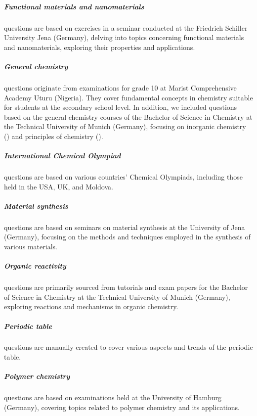 \documentclass[11pt, oneside]{article}
\begin{document}
\begin{refsection}
\subparagraph{Functional materials and nanomaterials}
  questions are based on exercises in a seminar conducted at the Friedrich Schiller University Jena (Germany), delving into topics concerning functional materials and nanomaterials, exploring their properties and applications.

\subparagraph{General chemistry}
 questions originate from examinations for grade 10 at Marist Comprehensive Academy Uturu (Nigeria). 
They cover fundamental concepts in chemistry suitable for students at the secondary school level.
In addition, we included questions based on the general chemistry courses of the Bachelor of Science in Chemistry at the Technical University of Munich (Germany), focusing on inorganic chemistry () and principles of chemistry ().

\subparagraph{International Chemical Olympiad}
 questions are based on various countries' Chemical Olympiads, including those held in the USA, UK, and Moldova.

\subparagraph{Material synthesis}
 questions are based on seminars on material synthesis at the University of Jena (Germany), focusing on the methods and techniques employed in the synthesis of various materials.

\subparagraph{Organic reactivity}
  questions are primarily sourced from tutorials and exam papers for the Bachelor of Science in Chemistry at the Technical University of Munich (Germany), exploring reactions and mechanisms in organic chemistry.

\subparagraph{Periodic table}
 questions are manually created to cover various aspects and trends of the periodic table.

\subparagraph{Polymer chemistry}
 questions are based on examinations held at the University of Hamburg (Germany), covering topics related to polymer chemistry and its applications.


\end{refsection}
\end{document}
